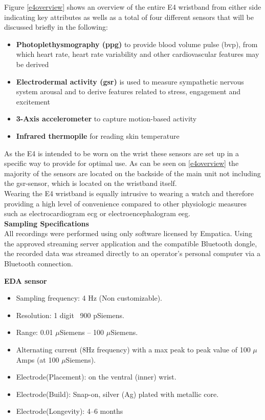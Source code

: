 Figure \ref{e4overview} shows an overview of the entire E4 wristband from either side indicating key attributes as wells as a total of four different sensors that will be discussed briefly in the following:

\begin{itemize}
\item \textbf{Photoplethysmography (\gls{ppg})} to provide blood volume pulse (\gls{bvp}), from which heart rate, heart rate variability and other cardiovascular features may be derived
\item \textbf{Electrodermal activity (\gls{gsr})} is used to measure sympathetic nervous system arousal and to derive features related to stress, engagement and excitement
\item \textbf{3-Axis accelerometer} to capture motion-based activity
\item \textbf{Infrared thermopile} for reading skin temperature
\end{itemize}

As the E4 is intended to be worn on the wrist these sensors are set up in a specific way to provide for optimal use. As can be seen on \ref{e4overview} the majority of the sensors are located on the backside of the main unit not including the \gls{gsr}-sensor, which is located on the wristband itself.\\
Wearing the E4 wristband is equally intrusive to wearing a watch and therefore providing a high level of convenience compared to other physiologic measures such as electrocardiogram \gls{ecg} or electroencephalogram \gls{eeg}.\\

\textbf{Sampling Specifications}\\[10pt]
All recordings were performed using only software licensed by Empatica. Using the approved streaming server application and the compatible Bluetooth dongle, the recorded data was streamed directly to an operator's personal computer via a Bluetooth connection. 

\textbf{EDA sensor}
\begin{itemize}
\item Sampling frequency: 4 Hz (Non customizable).
\item Resolution: 1 digit ~900 pSiemens.
\item Range: 0.01 $\mu$Siemens – 100 $\mu$Siemens.
\item Alternating current (8Hz frequency) with a
max peak to peak value of 100 $\mu$Amps (at 100
$\mu$Siemens).
\item Electrode(Placement): on the ventral (inner) wrist.
\item Electrode(Build): Snap-on, silver (Ag) plated with metallic core.
\item Electrode(Longevity): 4–6 months
\end{itemize}

